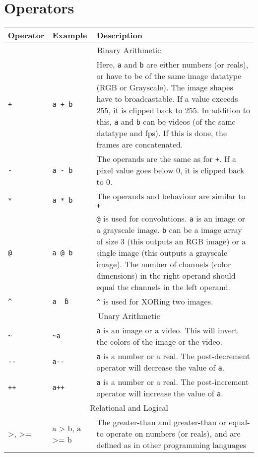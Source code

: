 \documentclass[a4paper, 11pt]{article}
\begin{document}
\section{Operators}
\begin{tabular}{ |p{3cm}|p{5cm}|p{7cm}|  }
  \hline
  Operator & Example & Description\\
  \hline
  \multicolumn{3}{|c|}{Binary Arithmetic} \\
  \hline
  \texttt{+} & \texttt{a + b} & Here, \texttt{a} and \texttt{b} are either numbers (or reals), or have to be of the same image datatype (RGB or Grayscale). The image shapes have to broadcastable. If a value exceeds 255, it is clipped back to 255. In addition to this, \texttt{a} and \texttt{b} can be videos (of the same datatype and fps). If this is done, the frames are concatenated.\\ \hline
  \texttt{-} & \texttt{a - b} & The operands are the same as for \texttt{+}. If a pixel value goes below 0, it is clipped back to 0.\\ \hline
  \texttt{*} & \texttt{a * b} & The operands and behaviour are similar to \texttt{+} \\ \hline
  \texttt{@} & \texttt{a @ b} & \texttt{@} is used for convolutions. \texttt{a} is an image or a grayscale image. \texttt{b} can be a image array of size 3 (this outputs an RGB image) or a single image (this outputs a grayscale image). The number of channels (color dimensions) in the right operand should equal the channels in the left operand. \\ \hline
  \texttt{\^} & \texttt{a \^\ b} & \texttt{\^} is used for XORing two images. \\ \hline 
  \hline
  \multicolumn{3}{|c|}{Unary Arithmetic} \\
  \hline
  \texttt{\textasciitilde} & \texttt{\textasciitilde a} & \texttt{a} is an image or a video. This will invert the colors of the image or the video. \\ \hline
  \texttt{-{}-} & \texttt{a-{}-} & \texttt{a} is a number or a real. The post-decrement operator will decrease the value of \texttt{a}. \\ \hline
  \texttt{++} & \texttt{a++} & \texttt{a} is a number or a real. The post-increment operator will increase the value of \texttt{a}. \\ \hline
  \multicolumn{3}{|c|}{Relational and Logical} \\
  \hline
  >, >= & a > b, a >= b &  The greater-than and greater-than or equal-to operate on numbers (or reals), and are defined as in other programming languages \\  \hline

\end{tabular}
\end{document}

